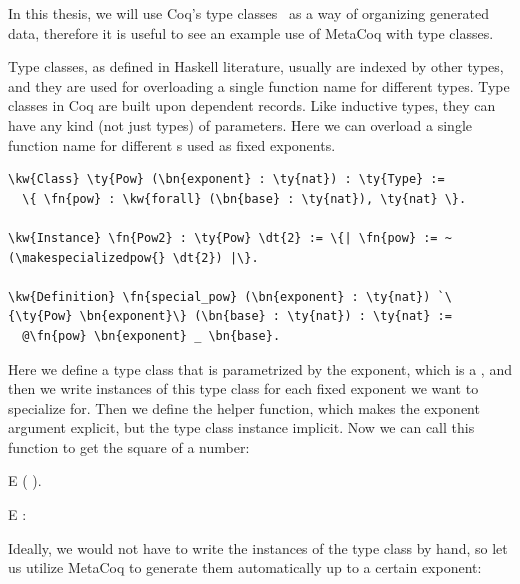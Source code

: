 In this thesis, we will use Coq's type classes~\cite{sozeau2008first} as a way of organizing generated data, therefore it is useful to see an example use of MetaCoq with type classes.

Type classes, as defined in Haskell literature, usually are indexed by other types, and they are used for overloading a single function name for different types. Type classes in Coq are built upon dependent records. Like \gls{inductive type}s, they can have any kind (not just types) of \gls{parameter}s.
Here we can overload a single function name for different s used as fixed exponents.

\begin{Verbatim}
\kw{Class} \ty{Pow} (\bn{exponent} : \ty{nat}) : \ty{Type} :=
  \{ \fn{pow} : \kw{forall} (\bn{base} : \ty{nat}), \ty{nat} \}.

\kw{Instance} \fn{Pow2} : \ty{Pow} \dt{2} := \{| \fn{pow} := ~(\makespecializedpow{} \dt{2}) |\}.

\kw{Definition} \fn{special_pow} (\bn{exponent} : \ty{nat}) `\{\ty{Pow} \bn{exponent}\} (\bn{base} : \ty{nat}) : \ty{nat} :=
  @\fn{pow} \bn{exponent} _ \bn{base}.
\end{Verbatim}

Here we define a type class that is parametrized by the exponent, which is a , and then we write instances of this type class for each fixed exponent we want to specialize for.
Then we define the  helper function, which makes the exponent argument explicit, but the type class instance implicit.
Now we can call this function to get the square of a number:

\newpage
\vspace{.2in}
\begin{SaveVerbatim}{E}
 (  ).
\end{SaveVerbatim}

\begin{SaveVerbatim}{E}
 : 
\end{SaveVerbatim}

Ideally, we would not have to write the instances of the  type class by hand, so let us utilize MetaCoq to generate them automatically up to a certain exponent:

